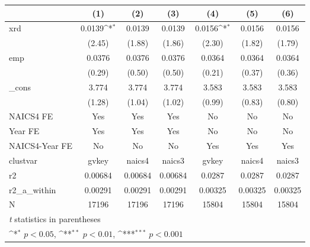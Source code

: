 {
\def\sym#1{\ifmmode^{#1}\else\(^{#1}\)\fi}
\begin{tabular}{l*{6}{c}}
\hline\hline
            &\multicolumn{1}{c}{(1)}         &\multicolumn{1}{c}{(2)}         &\multicolumn{1}{c}{(3)}         &\multicolumn{1}{c}{(4)}         &\multicolumn{1}{c}{(5)}         &\multicolumn{1}{c}{(6)}         \\
\hline
xrd         &      0.0139\sym{*}  &      0.0139         &      0.0139         &      0.0156\sym{*}  &      0.0156         &      0.0156         \\
            &      (2.45)         &      (1.88)         &      (1.86)         &      (2.30)         &      (1.82)         &      (1.79)         \\
[1em]
emp         &      0.0376         &      0.0376         &      0.0376         &      0.0364         &      0.0364         &      0.0364         \\
            &      (0.29)         &      (0.50)         &      (0.50)         &      (0.21)         &      (0.37)         &      (0.36)         \\
[1em]
\_cons      &       3.774         &       3.774         &       3.774         &       3.583         &       3.583         &       3.583         \\
            &      (1.28)         &      (1.04)         &      (1.02)         &      (0.99)         &      (0.83)         &      (0.80)         \\
[1em]
NAICS4 FE   &         Yes         &         Yes         &         Yes         &          No         &          No         &          No         \\
[1em]
Year FE     &         Yes         &         Yes         &         Yes         &          No         &          No         &          No         \\
[1em]
NAICS4-Year FE&          No         &          No         &          No         &         Yes         &         Yes         &         Yes         \\
\hline
clustvar    &       gvkey         &      naics4         &      naics3         &       gvkey         &      naics4         &      naics3         \\
r2          &     0.00684         &     0.00684         &     0.00684         &      0.0287         &      0.0287         &      0.0287         \\
r2\_a\_within &     0.00291         &     0.00291         &     0.00291         &     0.00325         &     0.00325         &     0.00325         \\
N           &       17196         &       17196         &       17196         &       15804         &       15804         &       15804         \\
\hline\hline
\multicolumn{7}{l}{\footnotesize \textit{t} statistics in parentheses}\\
\multicolumn{7}{l}{\footnotesize \sym{*} \(p<0.05\), \sym{**} \(p<0.01\), \sym{***} \(p<0.001\)}\\
\end{tabular}
}
